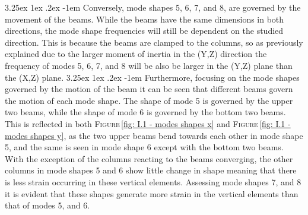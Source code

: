 \documentclass[11pt,a4paper,titlepage]{report}
\makeatletter
\renewcommand\paragraph{\@startsection{paragraph}{5}{\z@}%
  {3.25ex \@plus1ex \@minus.2ex}%
  {-1em}%
  {\normalfont\normalsize\bfseries}}
\makeatother
\begin{document}
\paragraph{}Conversely, mode shapes 5, 6, 7, and 8, are governed by the movement of the beams. While the beams have the same dimensions in both directions, the mode shape frequencies will still be dependent on the studied direction. This is because the beams are clamped to the columns, so as previously explained due to the larger moment of inertia in the (Y,Z) direction the frequency of modes 5, 6, 7, and 8 will be also be larger in the (Y,Z) plane than the (X,Z) plane. 
\paragraph{}Furthermore, focusing on the mode shapes governed by the motion of the beam it can be seen that different beams govern the motion of each mode shape. The shape of mode 5 is governed by the upper two beams, while the shape of mode 6 is governed by the bottom two beams. This is reflected in both \textsc{Figure}\,\ref{fig: I.1 - modes shapes x} and \textsc{Figure}\,\ref{fig: I.1 - modes shapes y}, as the two upper beams bend towards each other in mode shape 5, and the same is seen in mode shape 6 except with the bottom two beams. With the exception of the columns reacting to the beams converging, the other columns in mode shapes 5 and 6 show little change in shape meaning that there is less strain occurring in these vertical elements. Assessing mode shapes 7, and 8 it is evident that these shapes generate more strain in the vertical elements than that of modes 5, and 6.
\end{document}
